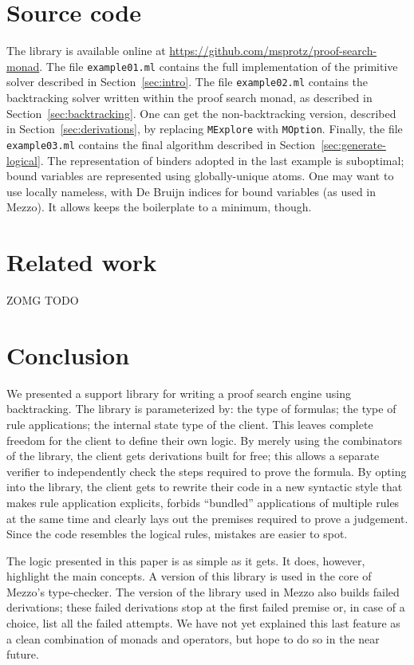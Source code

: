 \documentclass{easychair}
\def\li{\lstinline}
\newcommand{\sref}[1]{Section~\ref{sec:#1}}
\begin{document}
\section{Source code}

The library is available online at
\url{https://github.com/msprotz/proof-search-monad}. The file \li+example01.ml+
contains the full implementation of the primitive solver described in
\sref{intro}. The file \li+example02.ml+ contains the backtracking solver
written within the proof search monad, as described in \sref{backtracking}. One
can get the non-backtracking version, described in \sref{derivations}, by
replacing \li+MExplore+ with \li+MOption+. Finally, the file \li+example03.ml+
contains the final algorithm described in \sref{generate-logical}. The
representation of binders adopted in the last example is suboptimal; bound
variables are represented using globally-unique atoms. One may want to use
locally nameless, with De Bruijn indices for bound variables (as used in Mezzo).
It allows keeps the boilerplate to a minimum, though.

\section{Related work}

ZOMG TODO

\section{Conclusion}

We presented a support library for writing a proof search engine using
backtracking. The library is parameterized by: the type of formulas; the type of
rule applications; the internal state type of the client. This leaves complete
freedom for the client to define their own logic. By merely using the
combinators of the library, the client gets derivations built for free; this allows
a separate verifier to independently check the steps required to prove the
formula. By opting into the library, the client gets to rewrite their code in a
new syntactic style that makes rule application explicits, forbids ``bundled''
applications of multiple rules at the same time and clearly lays out the
premises required to prove a judgement. Since the code resembles the logical
rules, mistakes are easier to spot.

The logic presented in this paper is as simple as it gets. It does, however,
highlight the main concepts. A version of this library is used in the core of
Mezzo's type-checker. The version of the library used in Mezzo also builds
failed derivations; these failed derivations stop at the first failed premise
or, in case of a choice, list all the failed attempts. We have not yet explained
this last feature as a clean combination of monads and operators, but hope to do
so in the near future.



\end{document}
